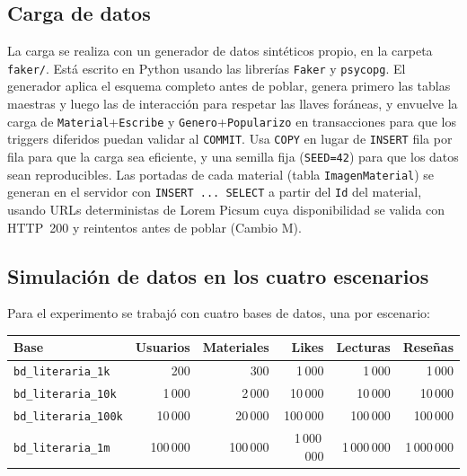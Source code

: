 \documentclass[12pt,a4paper]{article}
\begin{document}
\subsection{Carga de datos}
\label{sec:carga}

La carga se realiza con un generador de datos sintéticos propio, en la carpeta
\texttt{faker/}. Está escrito en Python usando las librerías \texttt{Faker} y
\texttt{psycopg}. El generador aplica el esquema completo antes de poblar,
genera primero las tablas maestras y luego las de interacción para respetar las
llaves foráneas, y envuelve la carga de \texttt{Material}+\texttt{Escribe} y
\texttt{Genero}+\texttt{Popularizo} en transacciones para que los triggers
diferidos puedan validar al \texttt{COMMIT}. Usa \texttt{COPY} en lugar de
\texttt{INSERT} fila por fila para que la carga sea eficiente, y una semilla
fija (\texttt{SEED=42}) para que los datos sean reproducibles. Las portadas de
cada material (tabla \texttt{ImagenMaterial}) se generan en el servidor con
\texttt{INSERT ... SELECT} a partir del \texttt{Id} del material, usando URLs
deterministas de Lorem Picsum cuya disponibilidad se valida con HTTP~200 y
reintentos antes de poblar (Cambio M).


\subsection{Simulación de datos en los cuatro escenarios}

Para el experimento se trabajó con cuatro bases de datos, una por escenario:


\begin{center}
\begin{tabular}{lrrrrr}
\toprule
\textbf{Base} & \textbf{Usuarios} & \textbf{Materiales} & \textbf{Likes} & \textbf{Lecturas} & \textbf{Reseñas} \\
\midrule
\texttt{bd\_literaria\_1k}   &     200 &     300 &     1\,000 &     1\,000 &     1\,000 \\
\texttt{bd\_literaria\_10k}  &   1\,000 &   2\,000 &    10\,000 &    10\,000 &    10\,000 \\
\texttt{bd\_literaria\_100k} &  10\,000 &  20\,000 &   100\,000 &   100\,000 &   100\,000 \\
\texttt{bd\_literaria\_1m}   & 100\,000 & 100\,000 & 1\,000\,000 & 1\,000\,000 & 1\,000\,000 \\
\bottomrule
\end{tabular}
\end{center}
\end{document}
